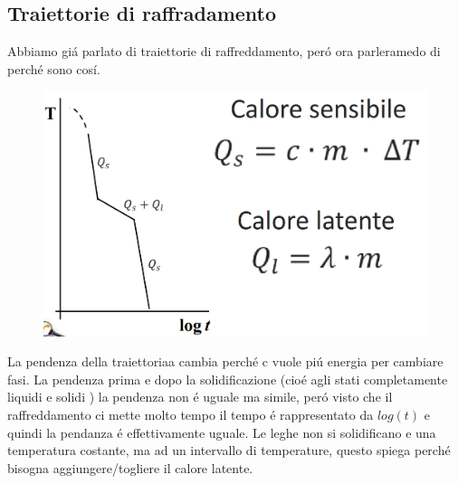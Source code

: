 \documentclass{article}
\begin{document}
{        \subsection{Traiettorie di raffradamento}
            Abbiamo gi\'a parlato di traiettorie di raffreddamento, per\'o ora parleramedo di perch\'e sono cos\'i.
            \begin{figure}[!h]
                \centering
                \includegraphics[width=.85\linewidth]{Spiegazione per il cambio di inclinazione nelle traiettorie di raffraddamento.png}
            \end{figure}
            La pendenza della traiettoriaa cambia perch\'e c vuole pi\'u energia per cambiare fasi. La pendenza prima e dopo la solidificazione (cio\'e agli stati completamente liquidi e solidi ) la pendenza non \'e uguale ma simile, per\'o visto che il raffreddamento ci mette molto tempo il tempo \'e rappresentato da $log(t)$ e quindi la pendanza \'e effettivamente uguale. Le leghe non si solidificano e una temperatura costante, ma ad un intervallo di temperature, questo spiega perch\'e bisogna aggiungere/togliere il calore latente.
}
\end{document}
